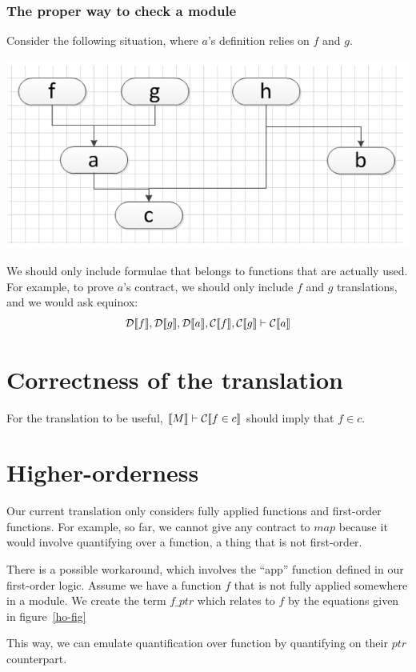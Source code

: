 \documentclass[preprint]{sigplanconf}
\begin{document}
\subsubsection{The proper way to check a module}
Consider the following situation, where $a$'s definition relies on $f$
and $g$.
\begin{center}
\includegraphics[scale=0.3]{flow.png}
\end{center}

We should only include formulae that belongs to functions that are
actually used. For example, to prove $a$'s contract, we should only
include $f$ and $g$ translations, and we would ask equinox:
$$ \mathcal{D} \llbracket f \rrbracket,\mathcal{D} \llbracket g \rrbracket,\mathcal{D} \llbracket a \rrbracket,\mathcal{C} \llbracket f \rrbracket,\mathcal{C} \llbracket g \rrbracket \vdash
\mathcal{C} \llbracket a \rrbracket$$


\section{Correctness of the translation}
For the translation to be useful, $\llbracket M \rrbracket \vdash \mathcal{C} \llbracket f \in c \rrbracket $
should imply that $f \in c$.


\section{Higher-orderness}
\label{ho}
Our current translation only considers fully applied functions and
first-order functions. For example, so far, we cannot give any
contract to $map$ because it would involve quantifying over a
function, a thing that is not first-order.

There is a possible workaround, which involves the ``app'' function
defined in our first-order logic. Assume we have a function $f$ that
is not fully applied somewhere in a module. We create the term
$f\_ptr$ which relates to $f$ by the equations given in figure~\ref{ho-fig}

This way, we can emulate quantification over function by quantifying
on their $ptr$ counterpart.
\end{document}
